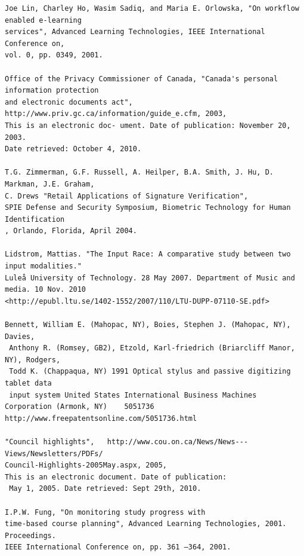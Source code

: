 \documentclass[11pt,a4paper]{report}
\begin{document}
\begin{verbatim}
Joe Lin, Charley Ho, Wasim Sadiq, and Maria E. Orlowska, "On workflow enabled e-learning 
services", Advanced Learning Technologies, IEEE International Conference on,
vol. 0, pp. 0349, 2001.

Office of the Privacy Commissioner of Canada, "Canada's personal information protection 
and electronic documents act", http://www.priv.gc.ca/information/guide_e.cfm, 2003, 
This is an electronic doc- ument. Date of publication: November 20, 2003. 
Date retrieved: October 4, 2010.

T.G. Zimmerman, G.F. Russell, A. Heilper, B.A. Smith, J. Hu, D. Markman, J.E. Graham, 
C. Drews "Retail Applications of Signature Verification",
SPIE Defense and Security Symposium, Biometric Technology for Human Identification
, Orlando, Florida, April 2004.

Lidstrom, Mattias. "The Input Race: A comparative study between two input modalities." 
Luleå University of Technology. 28 May 2007. Department of Music and media. 10 Nov. 2010 
<http://epubl.ltu.se/1402-1552/2007/110/LTU-DUPP-07110-SE.pdf>

Bennett, William E. (Mahopac, NY), Boies, Stephen J. (Mahopac, NY), Davies,
 Anthony R. (Romsey, GB2), Etzold, Karl-friedrich (Briarcliff Manor, NY), Rodgers, 
 Todd K. (Chappaqua, NY) 1991 Optical stylus and passive digitizing tablet data 
 input system United States International Business Machines Corporation (Armonk, NY)	5051736 http://www.freepatentsonline.com/5051736.html

"Council highlights",	http://www.cou.on.ca/News/News---Views/Newsletters/PDFs/ 
Council-Highlights-2005May.aspx, 2005, 
This is an electronic document. Date of publication:
 May 1, 2005. Date retrieved: Sept 29th, 2010.

I.P.W. Fung, "On monitoring study progress with 
time-based course planning", Advanced Learning Technologies, 2001. Proceedings. 
IEEE International Conference on, pp. 361 –364, 2001.
\end{verbatim}


\clearpage
\newpage 

\listoffigures

\clearpage
\newpage 

\printindex
\end{document}
